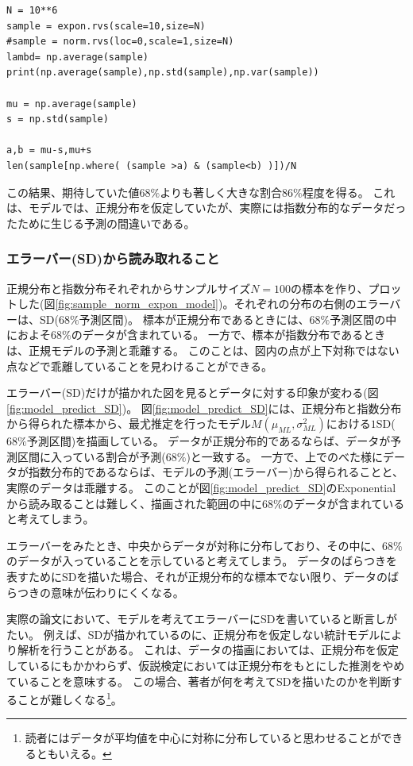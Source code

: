 \begin{lstlisting}
N = 10**6
sample = expon.rvs(scale=10,size=N)
#sample = norm.rvs(loc=0,scale=1,size=N)
lambd= np.average(sample)
print(np.average(sample),np.std(sample),np.var(sample))

mu = np.average(sample)
s = np.std(sample)

a,b = mu-s,mu+s
len(sample[np.where( (sample >a) & (sample<b) )])/N
\end{lstlisting}
この結果、期待していた値$68\%$よりも著しく大きな割合$86\%$程度を得る。
これは、モデルでは、正規分布を仮定していたが、実際には指数分布的なデータだったために生じる予測の間違いである。

\subsubsection{エラーバー(SD)から読み取れること}
正規分布と指数分布それぞれからサンプルサイズ$N=100$の標本を作り、プロットした(図\ref{fig:sample_norm_expon_model})。それぞれの分布の右側のエラーバーは、SD($68\%$予測区間)。
標本が正規分布であるときには、$68\%$予測区間の中におよそ$68\%$のデータが含まれている。
一方で、標本が指数分布であるときは、正規モデルの予測と乖離する。
このことは、図内の点が上下対称ではない点などで乖離していることを見わけることができる。

エラーバー(SD)だけが描かれた図を見るとデータに対する印象が変わる(図\ref{fig:model_predict_SD})。
図\ref{fig:model_predict_SD}には、正規分布と指数分布から得られた標本から、最尤推定を行ったモデル$M(\mu_{ML},\sigma^2_{ML})$における$1$SD($68\%$予測区間)を描画している。
データが正規分布的であるならば、データが予測区間に入っている割合が予測($68\%$)と一致する。
一方で、上でのべた様にデータが指数分布的であるならば、モデルの予測(エラーバー)から得られることと、実際のデータは乖離する。
このことが図\ref{fig:model_predict_SD}のExponentialから読み取ることは難しく、描画された範囲の中に$68\%$のデータが含まれていると考えてしまう。

エラーバーをみたとき、中央からデータが対称に分布しており、その中に、$68\%$のデータが入っていることを示していると考えてしまう。
データのばらつきを表すためにSDを描いた場合、それが正規分布的な標本でない限り、データのばらつきの意味が伝わりにくくなる。

実際の論文において、モデルを考えてエラーバーにSDを書いていると断言しがたい。
例えば、SDが描かれているのに、正規分布を仮定しない統計モデルにより解析を行うことがある。
これは、データの描画においては、正規分布を仮定しているにもかかわらず、仮説検定においては正規分布をもとにした推測をやめていることを意味する。
この場合、著者が何を考えてSDを描いたのかを判断することが難しくなる\footnote{読者にはデータが平均値を中心に対称に分布していると思わせることができるともいえる。}。

